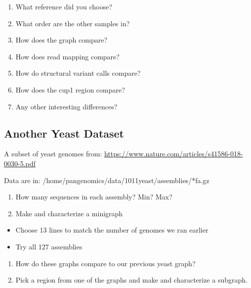 \documentclass[
]{book}
\providecommand{\tightlist}{%
  \setlength{\itemsep}{0pt}\setlength{\parskip}{0pt}}
\begin{document}
\begin{enumerate}
\def\labelenumi{\arabic{enumi}.}
\tightlist
\item
  What reference did you choose?
\item
  What order are the other samples in?
\item
  How does the graph compare?
\item
  How does read mapping compare?
\item
  How do structural variant calls compare?
\item
  How does the cup1 region compare?
\item
  Any other interesting differences?
\end{enumerate}

\hypertarget{another-yeast-dataset}{%
\subsection*{Another Yeast Dataset}\label{another-yeast-dataset}}

A subset of yeast genomes from: \url{https://www.nature.com/articles/s41586-018-0030-5.pdf}

Data are in: /home/pangenomics/data/1011yeast/assemblies/*fa.gz

\begin{enumerate}
\def\labelenumi{\arabic{enumi}.}
\tightlist
\item
  How many sequences in each assembly? Min? Max?
\item
  Make and characterize a minigraph
\end{enumerate}

\begin{itemize}
\tightlist
\item
  Choose 13 lines to match the number of genomes we ran earlier\\
\item
  Try all 127 assemblies\\
\end{itemize}

\begin{enumerate}
\def\labelenumi{\arabic{enumi}.}
\setcounter{enumi}{2}
\tightlist
\item
  How do these graphs compare to our previous yeast graph?
\item
  Pick a region from one of the graphs and make and characterize a subgraph.
\end{enumerate}
\end{document}
